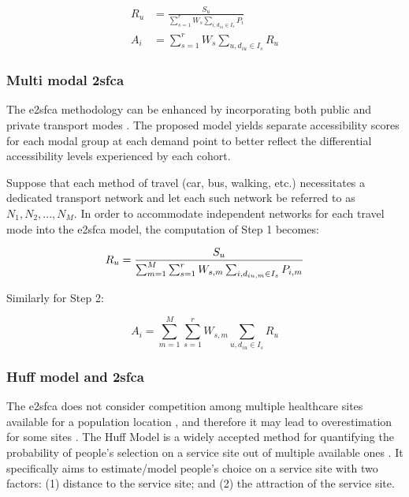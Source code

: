 \begin{align}
    R_u & =  \frac{S_u}{\sum_{s=1}^{r} W_s \sum_{i, d_{iu} \in I_s} P_i} \\
    A_i & = \sum_{s=1}^{r} W_s \sum_{u, d_{iu} \in I_s} R_u
\end{align}

\subsubsection{Multi modal \acl{2sfca}}

The \ac{e2sfca} methodology can be enhanced by incorporating both public and
private transport modes \cite{langford_multi-modal_2016}. The proposed model
yields separate accessibility scores for each modal group at each demand point
to better reflect the differential accessibility levels experienced by each
cohort.

Suppose that each method of travel (car, bus, walking, etc.) necessitates a
dedicated transport network and let each such network be referred to as $N_1,
    N_2, ..., N_M$. In order to accommodate independent networks for each travel
mode into the \ac{e2sfca} model, the computation of Step 1 becomes:

\begin{equation}
    R_u =  \frac{S_u}{\sum_{m=1}^{M} \sum_{s=1}^{r} W_{s,m} \sum_{i, d_{iu,m} \in I_s} P_{i,m}} \\
\end{equation}

Similarly for Step 2:

\begin{equation}
    A_i = \sum_{m=1}^{M} \sum_{s=1}^{r} W_{s, m} \sum_{u, d_{iu} \in I_s} R_u
\end{equation}

\subsubsection{Huff model and \acl{2sfca}}

The \ac{e2sfca} does not consider competition among multiple healthcare sites
available for a population location \cite{wan_three-step_2012}, and therefore it
may lead to overestimation for some sites \cite{luo_integrating_2014}. The Huff
Model is a widely accepted method for quantifying the probability of people's
selection on a service site out of multiple available ones
\cite{huff_probabilistic_1963}. It specifically aims to estimate/model people's
choice on a service site with two factors: (1) distance to the service site; and
(2) the attraction of the service site.

